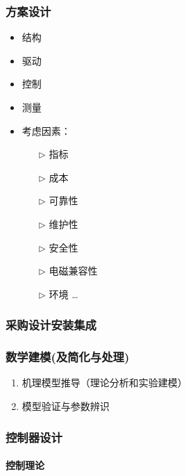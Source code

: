 \documentclass[14pt,a4paper]{article}
\theoremstyle{plain}
\theoremstyle{definition}
\theoremstyle{remark}
\theoremstyle{plain}
\theoremstyle{plain}
\theoremstyle{definition}
\begin{document}
			\subsubsection{方案设计}%
			\label{ssub:方案设计} 
				\begin{itemize}
					\item 结构
					\item 驱动
					\item 控制
					\item 测量
					\item 考虑因素：
						\begin{itemize}
							\item[$\triangleright$] 指标
							\item[$\triangleright$] 成本 
							\item[$\triangleright$] 可靠性 
							\item[$\triangleright$] 维护性
							\item[$\triangleright$] 安全性
							\item[$\triangleright$] 电磁兼容性 
							\item[$\triangleright$] 环境
							\ldots
						\end{itemize}  
				\end{itemize}  

			\subsubsection{采购设计安装集成}%
			\label{ssub:采购设计安装集成}
				
			\subsubsection{数学建模(及简化与处理)}%
			\label{ssub:数学建模_及简化与处理_}
		
				\begin{enumerate}
					\item 机理模型推导（理论分析和实验建模） 
					\item 模型验证与参数辨识 
				\end{enumerate} 
			
			\subsubsection{控制器设计}%
			\label{ssub:控制器设计}
		
				\paragraph{控制理论}%
				\label{par:控制理论}
				
\end{document}

